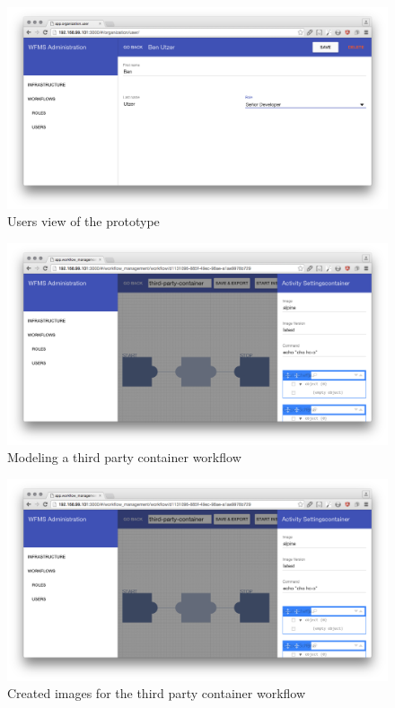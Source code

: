   \begin{figure}[htbp]
    \centering
    \includegraphics[width=\textwidth]{./content/images/usecase/case_study_9.png}
    \caption{Users view of the prototype}
    \label{fig:dev_user}
  \end{figure}

  \begin{figure}[htbp]
    \centering
    \includegraphics[width=\textwidth]{./content/images/usecase/case_study_10.png}
    \caption{Modeling a third party container workflow}
    \label{fig:tpc_wf}
  \end{figure}

  \begin{figure}[htbp]
    \centering
    \includegraphics[width=\textwidth]{./content/images/usecase/case_study_10.png}
    \caption{Created images for the third party container workflow}
    \label{fig:tpc_images}
  \end{figure}

